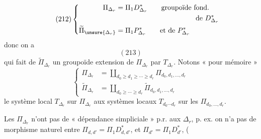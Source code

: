 \[
\tag{212}
\left\{\begin{aligned}
\Pi_{\Delta_r}&=\Pi_1D^*_{\Delta_r}\qquad\text{groupoïde fond.}\\
&\hspace{4cm}\text{de }D^*_{\Delta_r}\\
\widetilde\Pi_{\unsure{\Delta_r}}&=\Pi_1P^*_{\Delta_r}\qquad\text{et de }P^*_{\Delta_r}
\end{aligned}\right.
\]
donc on a
\[
(213)
\]
qui fait de $\widetilde\Pi_{\Delta_r}$ un groupoïde
extension de $\Pi_{\Delta_r}$ par $T_{\Delta_r}$.
Notons « pour mémoire »
\[
\tag{214}
\left\{\begin{aligned}
\Pi_{\Delta_r}&=\coprod_{d_0\geq d_1\geq\cdots\geq d_r}\Pi_{d_0,d_1,\ldots,d_r}\\
\widetilde\Pi_{\Delta_r}&=\coprod_{d_0\geq\cdots\geq d_r}\widetilde\Pi_{d_0,d_1,\ldots,d_r}
\end{aligned}\right.
\]
le système local $T_{\Delta_r}$ sur $\Pi_{\Delta_r}$ 
 aux systèmes locaux
$T_{d_0\cdots d_r}$ sur les $\Pi_{d_0,\ldots,d_r}$.

Les $\Pi_{\Delta_r}$ n'ont pas de « dépendance
simpliciale » p.r. aux $\Delta_r$, p. ex. on n'a
pas de morphisme naturel entre
$\Pi_{d,d'}=\Pi_1D^*_{d,d'}$, et $\Pi_{d'}=\Pi_1D^*_{d'}$, (
